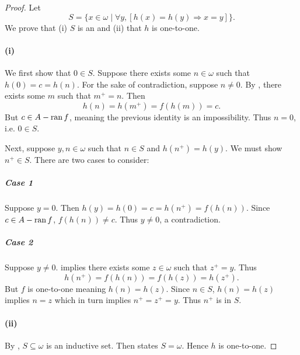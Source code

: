 \documentclass{report}
\begin{document}
\begin{proof}

  Let
    $$S = \{x \in \omega \mid \forall y,
      \left[ h(x) = h(y) \Rightarrow x = y \right]\}.$$
  We prove that (i) $S$ is an  and (ii) that $h$ is
    one-to-one.

  \paragraph{(i)}%
  \label{par:exercise-4.8-i}

    We first show that $0 \in S$.
    Suppose there exists some $n \in \omega$ such that $h(0) = c = h(n)$.
    For the sake of contradiction, suppose $n \neq 0$.
    By , there exists some $m$ such that $m^+ = n$.
    Then $$h(n) = h(m^+) = f(h(m)) = c.$$
    But $c \in A - \mathop{\text{ran}}{f}$, meaning the previous identity is an impossibility.
    Thus $n = 0$, i.e. $0 \in S$.

    Next, suppose $y, n \in \omega$ such that $n \in S$ and $h(n^+) = h(y)$.
    We must show $n^+ \in S$.
    There are two cases to consider:

    \subparagraph{Case 1}%

      Suppose $y = 0$.
      Then $h(y) = h(0) = c = h(n^+) = f(h(n))$.
      Since $c \in A - \mathop{\text{ran}}{f}$, $f(h(n)) \neq c$.
      Thus $y \neq 0$, a contradiction.

    \subparagraph{Case 2}%

      Suppose $y \neq 0$.
       implies there exists some $z \in \omega$ such
        that $z^+ = y$.
      Thus $$h(n^+) = f(h(n)) = f(h(z)) = h(z^+).$$
      But $f$ is one-to-one meaning $h(n) = h(z)$.
      Since $n \in S$, $h(n) = h(z)$ implies $n = z$ which in turn implies
        $n^+ = z^+ = y$.
      Thus $n^+$ is in $S$.

  \paragraph{(ii)}%

    By , $S \subseteq \omega$ is an inductive set.
    Then  states $S = \omega$.
    Hence $h$ is one-to-one.

\end{proof}

\subsection{}%
\end{document}
